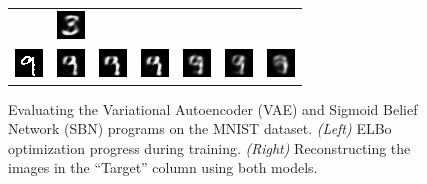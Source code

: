 \begin{figure}
\begin{minipage}{0.5\linewidth}
\begin{tabular}{c  c c c c c c}
& \includegraphics[width=0.12\linewidth]{figs/results/vae_sbn/sbn_encodeDecode_target_002_sample_003.png}
\\
 \includegraphics[width=0.12\linewidth]{figs/results/vae_sbn/vae_encodeDecode_target_003.png}
 \hspace{3pt}
& \includegraphics[width=0.12\linewidth]{figs/results/vae_sbn/vae_encodeDecode_target_003_sample_001.png}
& \includegraphics[width=0.12\linewidth]{figs/results/vae_sbn/vae_encodeDecode_target_003_sample_002.png}
& \includegraphics[width=0.12\linewidth]{figs/results/vae_sbn/vae_encodeDecode_target_003_sample_003.png}
\hspace{3pt}
& \includegraphics[width=0.12\linewidth]{figs/results/vae_sbn/sbn_encodeDecode_target_003_sample_001.png}
& \includegraphics[width=0.12\linewidth]{figs/results/vae_sbn/sbn_encodeDecode_target_003_sample_002.png}
& \includegraphics[width=0.12\linewidth]{figs/results/vae_sbn/sbn_encodeDecode_target_003_sample_003.png}
\end{tabular}
\end{minipage}
\caption{Evaluating the Variational Autoencoder (VAE) and Sigmoid Belief Network (SBN) programs on the MNIST dataset. \emph{(Left)} ELBo optimization progress during training. \emph{(Right)} Reconstructing the images in the ``Target'' column using both models.}
\label{fig:vae_sbn_results}
\end{figure}


